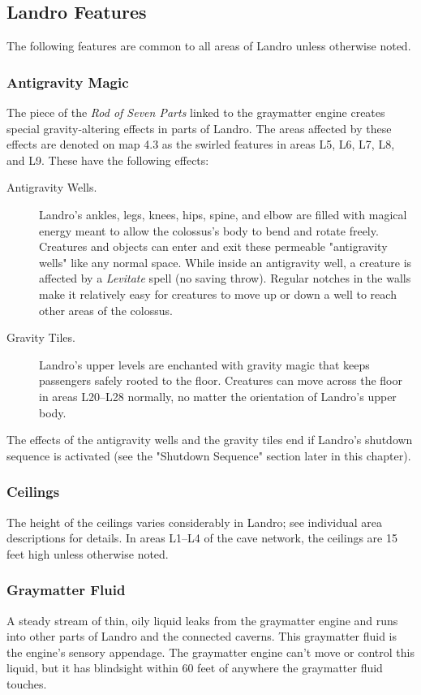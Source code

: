 \documentclass[10pt,a4paper,twoside,bg=print,twocolumn,openany,nodeprecatedcode]{dndbook}
\begin{document}
\subsection{Landro Features}
The following features are common to all areas of Landro unless otherwise noted.

\subsubsection{Antigravity Magic}
The piece of the \textit{Rod of Seven Parts} linked to the graymatter engine creates special gravity-altering effects in parts of Landro. The areas affected by these effects are denoted on map 4.3 as the swirled features in areas L5, L6, L7, L8, and L9. These have the following effects:


\begin{description}
\item[Antigravity Wells.]
Landro's ankles, legs, knees, hips, spine, and elbow are filled with magical energy meant to allow the colossus's body to bend and rotate freely. Creatures and objects can enter and exit these permeable "antigravity wells" like any normal space. While inside an antigravity well, a creature is affected by a \textit{Levitate} spell (no saving throw). Regular notches in the walls make it relatively easy for creatures to move up or down a well to reach other areas of the colossus.
\item[Gravity Tiles.]
Landro's upper levels are enchanted with gravity magic that keeps passengers safely rooted to the floor. Creatures can move across the floor in areas L20–L28 normally, no matter the orientation of Landro's upper body.
\end{description}

The effects of the antigravity wells and the gravity tiles end if Landro's shutdown sequence is activated (see the "Shutdown Sequence" section later in this chapter).

\subsubsection{Ceilings}
The height of the ceilings varies considerably in Landro; see individual area descriptions for details. In areas L1–L4 of the cave network, the ceilings are 15 feet high unless otherwise noted.

\subsubsection{Graymatter Fluid}
A steady stream of thin, oily liquid leaks from the graymatter engine and runs into other parts of Landro and the connected caverns. This graymatter fluid is the engine's sensory appendage. The graymatter engine can't move or control this liquid, but it has blindsight within 60 feet of anywhere the graymatter fluid touches.
\end{document}
